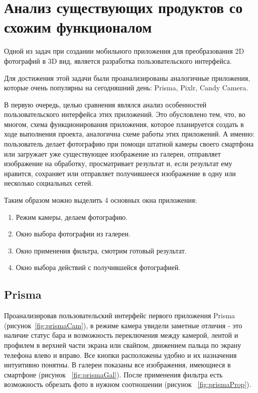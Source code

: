 \section{Анализ существующих продуктов со схожим функционалом}
Одной из задач при создании мобильного приложения для преобразования 2D фотографий в 3D вид, является разработка пользовательского интерфейса.

Для достижения этой задачи были проанализированы аналогичные приложения, которые очень популярны на сегодняшний день: Prisma, Pixlr, Candy Camera.

В первую очередь, целью сравнения являлся анализ особенностей пользовательского интерфейса этих приложений. Это обусловлено тем, что, во многом, схема функционирования приложения, которое планируется создать в ходе выполнения проекта, аналогична схеме работы этих приложений. А именно: пользователь делает фотографию при помощи штатной камеры своего смартфона или загружает уже существующее изображение из галереи, отправляет изображение на обработку, просматривает результат и, если результат ему нравится, сохраняет или отправляет получившееся изображение в одну или несколько социальных сетей.

Таким образом можно выделить 4 основных окна приложения:
\begin{enumerate}
	\item Режим камеры, делаем фотографию.
	\item Окно выбора фотографии из галереи.
	\item Окно применения фильтра, смотрим готовый результат.
	\item Окно выбора действий с получившейся фотографией.
\end{enumerate}

\subsection{Prisma}
Проанализировав пользовательский интерфейс первого приложения Prisma (рисунок~\ref{fig:prismaCam}), в режиме камера увидели заметные отличия - это наличие статус бара и возможность переключения между камерой, лентой и профилем в верхней части экрана или свайпом, движением пальца по экрану телефона влево и вправо. Все кнопки расположены удобно и их назначения интуитивно понятны. В галереи показаны все изображения, имеющиеся в смартфоне (рисунок ~\ref{fig:prismaGal}). После применения фильтра есть возможность обрезать фото в нужном соотношении (рисунок ~\ref{fig:prismaProp}).

